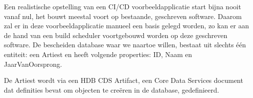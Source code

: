             Een realistische opstelling van een CI/CD voorbeeldapplicatie start bijna nooit vanaf nul, het bouwt meestal voort op bestaande, geschreven software.
            Daarom zal er in deze voorbeeldapplicatie manueel een basis gelegd worden, zo kan er aan de hand van een build scheduler voortgebouwd worden op deze geschreven software.
            De bescheiden database waar we naartoe willen, bestaat uit slechts één entiteit: een Artiest en heeft volgende properties: ID, Naam en JaarVanOorsprong.
            
            De Artiest wordt via een HDB CDS Artifact, een Core Data Services document dat definities bevat om objecten te creëren in de database, gedefinieerd.
